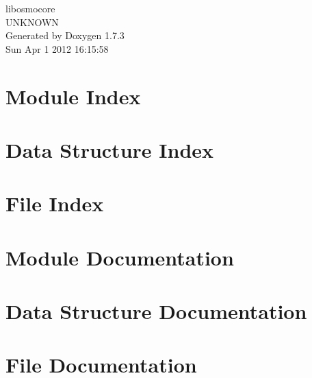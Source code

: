\documentclass[a4paper]{book}
\begin{document}
\begin{titlepage}
\vspace*{7cm}
\begin{center}
{\Large libosmocore \\[1ex]\large UNKNOWN }\\
\vspace*{1cm}
{\large Generated by Doxygen 1.7.3}\\
\vspace*{0.5cm}
{\small Sun Apr 1 2012 16:15:58}\\
\end{center}
\end{titlepage}
\clearemptydoublepage
{}
\tableofcontents
\clearemptydoublepage
{}
\chapter{Module Index}

\chapter{Data Structure Index}

\chapter{File Index}

\chapter{Module Documentation}

\chapter{Data Structure Documentation}




\chapter{File Documentation}








\printindex
\end{document}
